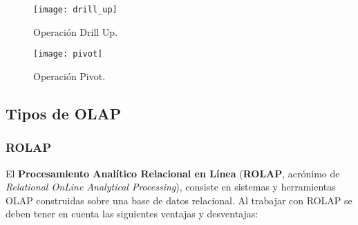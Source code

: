 \documentclass[a4paper,11pt]{article}
\begin{document}
    \begin{figure}
      \begin{center}
        \texttt{[image: drill\_up]}
        \caption{Operación Drill Up. \cite{operaciones}}
        \label{drill_up}
      \end{center}
    \end{figure}
    
    \begin{figure}
      \begin{center}
        \texttt{[image: pivot]}
        \caption{Operación Pivot. \cite{operaciones}}
        \label{pivot}
      \end{center}
    \end{figure}
    
    
    \subsection{Tipos de OLAP}
    
    \subsubsection{ROLAP}
    
    El \textbf{Procesamiento Analítico Relacional en Línea} (\textbf{ROLAP}, acrónimo de \textit{Relational OnLine Analytical Processing}), consiste en sistemas
    y herramientas OLAP construidas sobre una base de datos relacional. Al trabajar con ROLAP se deben tener en cuenta las siguientes ventajas y desventajas:
    
\end{document}
